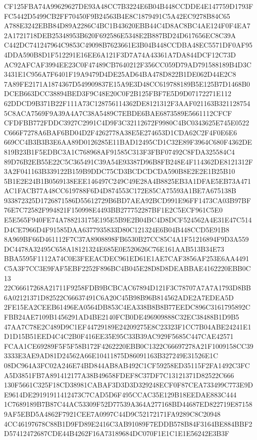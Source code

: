 \documentclass[UTF8,fontset=fandol,zihao=-4,a4paper]{ctexart}
\begin{document}
{{CF125FBA74A99629627DE93A48CC7B3224E6B04B448CCDDE4E147759D1793FFC5442D5499CB2FF70450F9B24563B4E8C1879491C5A42EC9278B84C65
A788E3242EBB84D89A2286C4BC1B43620EBB44C4D8AC8BC4AE124F0F4EA72A1721718DEB25348953B620F692586E5348E2B887BD24D617656EC8C39A
C442DC741247964C9853C49098B7623661E3B04B448CCDBA48EC5571DF0AF954DDA590B8D1F512291E16EE6A121F3D7A74A43361A7DA844DCF12C73D
AC92AFCAF3994EE23C0F47489CB7640212F356CC059D79AD791588189B4D3C3431E1C956A7F6401F19A9479D4DE25AD64BA478D822B1DE062D44E2C8
7A89FE2171A1874367D549909837E15A9E3D48CC619788189B5E125B7D1468B0DCEB663DCC38894BED3F9C48E20C0F2B125FBF7E5D9D07172271E112
62DDCD9B371B22F111A73C128756114362DE8121312F3AAF021163B3211287545C8ACA7569F9A39A4A7C38A5489C7EBDE6BAE6873589E5661112CFCF
CFDFBB772FDDC3927C2991C4D9F3C32112672F9980C4BC0343625E745E0522C666F7278A6BAF6BD04D2F4262778A38E5E274653D1CDA62C2F4F0E6E6
669CC4B3B3B3E6AA89D0126285E11BAD12495CD1C32E89F3964C680F4362DE819B23B1F5EDBC3A1C768968AF91585C313F3FBF07492C8FDA325584C4
89D76B2EB55E22C5C365491C39A54E93387D96B8FB248E4F114362DE8121312F3A2F041163B339122B159B9DDC75CD3BCDCDCDA590B8E2E2E1B25B10
5B1E2E24B1B0569138EEE146497C249C49E28A4B8825EB3A1DFAE5EB73A471AC1FACB77A48CC619788F6D4D874553C172E85CA75593A1BE7A675138B
933872325D1726871586D55612729B6BD7AEA92BCD991E96FF1473CA03B97BF76E7C72582F994821F150998E4493BB277752287BF1E2C5ECF961C5E0
E5E565F940FE74A788213175E195E5B9E2B04BC4D8DCF524562A4E31E47C514D4CE7966D4F91585DAA6377935833D80C121324E6B04B448CCD5E91B8
8A969BF66D461112F7C37A8908898FB6530B27CC85C4A1F51216894F9D3A559DC4478A32495C658A18121324E685E0E520626C76E161AAB513B34E73
BBA5595F1112A74C0E3FEEACDEC961ED61E1AE7CAF3856AF253E6AA4491C5A3F7CC3E9FAF5EBF2252F896BC4B045E28D8D8DEABBAE4162220EBB0C13
22C66617268A21711F9258FDB9BCBCAC67894D121F3C78707A7A7A1793D8BB6A02121371D82522C66637491C6A20C45B98B96B814562ADE2A7EDEA5D
2FE15EA2CEEB61496EA0564DB853C4EA338B8B8B77EEDC896C3161795892CFBB24AE7109B1456291AD4BE2140FCB0DE496909888C32EC38488B1D9B5
47AA7C78E2C489D9C1EF44729189E24209275E8C23323F1CC7B04ABE24241E1D1D15B51EED4C4C2B0F416EE35E95C33B39AC929F5685C447CAE42571
FCAA1CE69289F5F5F58B172F4262220EBB0C1322C66697278A21F1009158CC393333E3AE9AD81D24562A66E10411875D86091163B327249E31526E1C
08DC964A3FC02A246E74BD844AB8AB492C1CF59258ED35115F2FA1492C3FCA5D3851FB7A891412177A38B49658FDEF8C37DF7C13121371D82522C666
130F5661C325F18CD38981CABAF3D3D3D329248ECF0F87CEA733499C773E9DE9614DE29191911412473C7CAD5D6F495CCAC35E129B18EEDAE883C444
1C7689189B7B87C44AC53309F52D77539A364A277168BD44687ED822719E871589AF5EBD5A4862F7921CEE7A0997C44D9C52172171FA9289C8C20948
4CC46197678C88B1D9FD89E2416C3AB91089F7EDDB578B84F3164BE884BBF2D57412472687CDE44B4262F16A73189684DC070F1E1C1E1E56242E3B3F
}}
\end{document}
